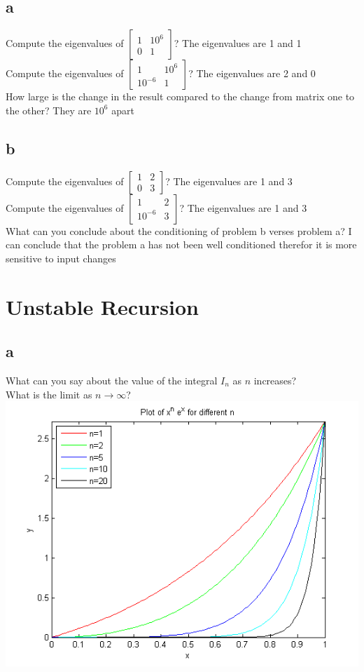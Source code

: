 \documentclass[letterpaper,12pt]{article}
\begin{document}
\subsection*{a}Compute the eigenvalues of 
$\begin{bmatrix}
 1 & 10^6 \\
  0 & 1 
\end{bmatrix}$? The eigenvalues are 1 and 1\\
Compute the eigenvalues of 
$\begin{bmatrix}
 1 & 10^6 \\
  10^{-6} & 1 
\end{bmatrix}$? The eigenvalues are 2 and 0\\
How large is the change in the result compared to the change from matrix one to the other? They are $10^6$ apart
\subsection*{b}Compute the eigenvalues of 
$\begin{bmatrix}
 1 & 2 \\
  0 & 3 
\end{bmatrix}$? The eigenvalues are 1 and 3\\
Compute the eigenvalues of 
$\begin{bmatrix}
 1 & 2 \\
  10^{-6} & 3 
\end{bmatrix}$? The eigenvalues are 1 and 3\\
What can you conclude about the conditioning of problem b verses problem a? I can conclude that the problem a has not been well conditioned therefor it is more sensitive to input changes


\section{Unstable Recursion}
\subsection*{a}
What can you say about the value of the integral $I_n$ as $n$ increases?\\
What is the limit as $n\rightarrow\infty$?\\
\includegraphics[]{integralPlot.png}
\newpage
\end{document}
